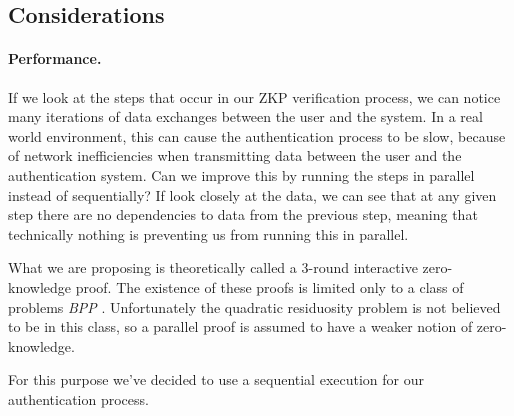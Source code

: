 \subsection{Considerations}
\label{section:pefromance-considerations}
\paragraph{Performance.}
If we look at the steps that occur in our ZKP verification process, we can notice many iterations of data exchanges between the user and the system.
In a real world environment, this can cause the authentication process to be slow, because of network inefficiencies when transmitting data between the user and the authentication system.
Can we improve this by running the steps in parallel instead of sequentially?
If look closely at the data, we can see that at any given step there are no dependencies to data from the previous step, meaning that technically nothing is preventing us from running this in parallel.

What we are proposing is theoretically called a 3-round interactive zero-knowledge proof.
The existence of these proofs is limited only to a class of problems \textit{BPP} \cite{goldreich1996composition}.
Unfortunately the quadratic residuosity problem is not believed to be in this class, so a parallel proof is assumed to have a weaker notion of zero-knowledge.

For this purpose we've decided to use a sequential execution for our authentication process.


%
%
%





